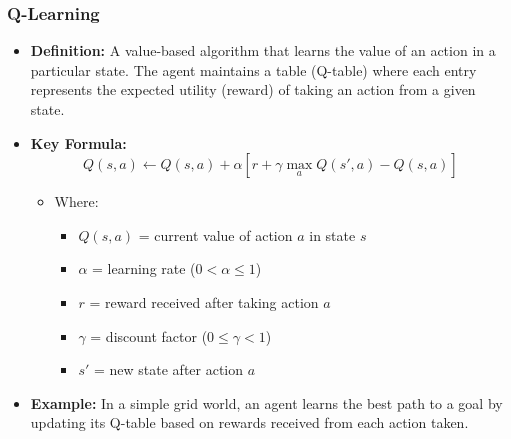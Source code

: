 \documentclass[aspectratio=169]{beamer}
\begin{document}
\begin{frame}[fragile]
    \frametitle{Q-Learning}
    \begin{itemize}
        \item \textbf{Definition:} A value-based algorithm that learns the value of an action in a particular state. The agent maintains a table (Q-table) where each entry represents the expected utility (reward) of taking an action from a given state.
        
        \item \textbf{Key Formula:}
        \begin{equation}
            Q(s, a) \leftarrow Q(s, a) + \alpha \left[ r + \gamma \max_a Q(s', a) - Q(s, a) \right]
        \end{equation}
        \begin{itemize}
            \item Where:
            \begin{itemize}
                \item $Q(s, a)$ = current value of action $a$ in state $s$
                \item $\alpha$ = learning rate ($0 < \alpha \leq 1$)
                \item $r$ = reward received after taking action $a$
                \item $\gamma$ = discount factor ($0 \leq \gamma < 1$)
                \item $s'$ = new state after action $a$
            \end{itemize}
        \end{itemize}
        
        \item \textbf{Example:} In a simple grid world, an agent learns the best path to a goal by updating its Q-table based on rewards received from each action taken.
    \end{itemize}
\end{frame}
\end{document}

